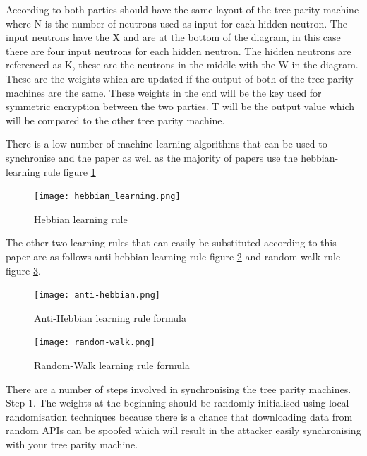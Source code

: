 According to \cite{Genetic_Key_Guided_Neural_Deep_Learning_based_Encryption} both parties should have the same layout of the tree parity machine where N is the number of neutrons used as input for each hidden neutron. The input neutrons have the X and are at the bottom of the diagram, in this case there are four input neutrons for each hidden neutron. The hidden neutrons are referenced as K, these are the neutrons in the middle with the W in the diagram. These are the weights which are updated if the output of both of the tree parity machines are the same. These weights in the end will be the key used for symmetric encryption between the two parties. T will be the output value which will be compared to the other tree parity machine. 

There is a low number of machine learning algorithms that can be used to synchronise and the paper \cite{Genetic_Key_Guided_Neural_Deep_Learning_based_Encryption} as well as the majority of papers use the hebbian-learning rule figure \ref{fig:hebianFormula}

\begin{figure}[ht]
  \centering
      \texttt{[image: hebbian\_learning.png]}
  \caption[Hebbian learning rule]{Hebbian learning rule\cite{Genetic_Key_Guided_Neural_Deep_Learning_based_Encryption}}
  \label{fig:hebianFormula}
\end{figure}

The other two learning rules that can easily be substituted according to this paper \cite{DESIGN_OF_AN_EFFICIENT_NEURAL_KEY_GENERATION} are as follows anti-hebbian learning rule figure \ref{fig:antihebbianlearning} and random-walk rule figure \ref{fig:randomwalklearning}.

\begin{figure}[ht]
  \centering
      \texttt{[image: anti-hebbian.png]}
  \caption[Anti-Hebbian learning rule formula]{Anti-Hebbian learning rule formula\cite{DESIGN_OF_AN_EFFICIENT_NEURAL_KEY_GENERATION}}
  \label{fig:antihebbianlearning}
\end{figure}

\begin{figure}[ht]
  \centering
      \texttt{[image: random-walk.png]}
  \caption[Random-Walk learning rule formula]{Random-Walk learning rule formula\cite{DESIGN_OF_AN_EFFICIENT_NEURAL_KEY_GENERATION}}
  \label{fig:randomwalklearning}
\end{figure}

There are a number of steps involved in synchronising the tree parity machines.
Step 1. The weights at the beginning should be randomly initialised using local randomisation techniques because there is a chance that downloading data from random APIs can be spoofed which will result in the attacker easily synchronising with your tree parity machine. 


